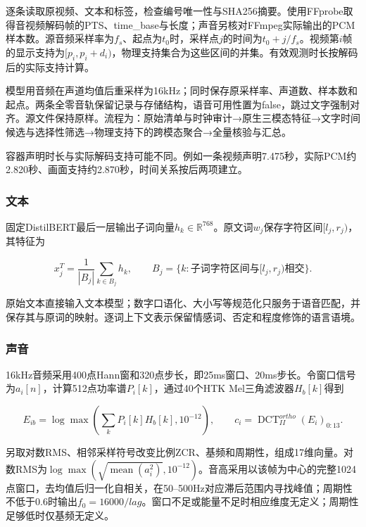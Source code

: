 逐条读取原视频、文本和标签，检查编号唯一性与SHA256摘要。使用FFprobe取得音视频解码帧的PTS、time\_base与长度；声音另核对FFmpeg实际输出的PCM样本数。源音频采样率为\(f_s\)、起点为\(t_0\)时，采样点\(j\)的时间为\(t_0+j/f_s\)。视频第\(i\)帧的显示支持为\([p_i,p_i+d_i)\)，物理支持集合为这些区间的并集。有效观测时长按解码后的实际支持计算。

模型用音频在声道均值后重采样为16kHz；同时保存原采样率、声道数、样本数和起点。两条全零音轨保留记录与存储结构，语音可用性置为false，跳过文字强制对齐。源文件保持原样。流程为：原始清单与时钟审计→原生三模态特征→文字时间候选与选择性筛选→物理支持下的跨模态聚合→全量核验与汇总。

容器声明时长与实际解码支持可能不同。例如一条视频声明7.475秒，实际PCM约2.820秒、画面支持约2.870秒，时间关系按后两项建立。

\hypertarget{q1-ux6587ux672c}{%
\subsubsection{文本}\label{q1-ux6587ux672c}}

固定DistilBERT\cite{q1-ref1}最后一层输出子词向量\(h_k\in\mathbb R^{768}\)。原文词\(w_j\)保存字符区间\([l_j,r_j)\)，其特征为

\begin{equation}x^T_j=\frac{1}{|B_j|}\sum_{k\in B_j}h_k,\qquad B_j=\{k:\text{子词字符区间与}[l_j,r_j)\text{相交}\}.\end{equation}

原始文本直接输入文本模型；数字口语化、大小写等规范化只服务于语音匹配，并保存其与原词的映射。逐词上下文表示保留情感词、否定和程度修饰的语言语境。

\hypertarget{q1-ux58f0ux97f3}{%
\subsubsection{声音}\label{q1-ux58f0ux97f3}}

16kHz音频采用400点Hann窗和320点步长，即25ms窗口、20ms步长。令窗口信号为\(a_i[n]\)，计算512点功率谱\(P_i[k]\)，通过40个HTK Mel三角滤波器\(H_b[k]\)得到

\begin{equation}E_{ib}=\log\max\left(\sum_kP_i[k]H_b[k],10^{-12}\right),\qquad c_i=\operatorname{DCT}_{II}^{ortho}(E_i)_{0:13}.\end{equation}

另取对数RMS、相邻采样符号改变比例ZCR、基频和周期性，组成17维向量。对数RMS为\(\log\max(\sqrt{\operatorname{mean}(a_i^2)},10^{-12})\)。音高采用以该帧为中心的完整1024点窗口，去均值后归一化自相关，在50--500Hz对应滞后范围内寻找峰值；周期性不低于0.6时输出\(f_0=16000/lag\)。窗口不足或能量不足时相应维度无定义；周期性足够低时仅基频无定义。

